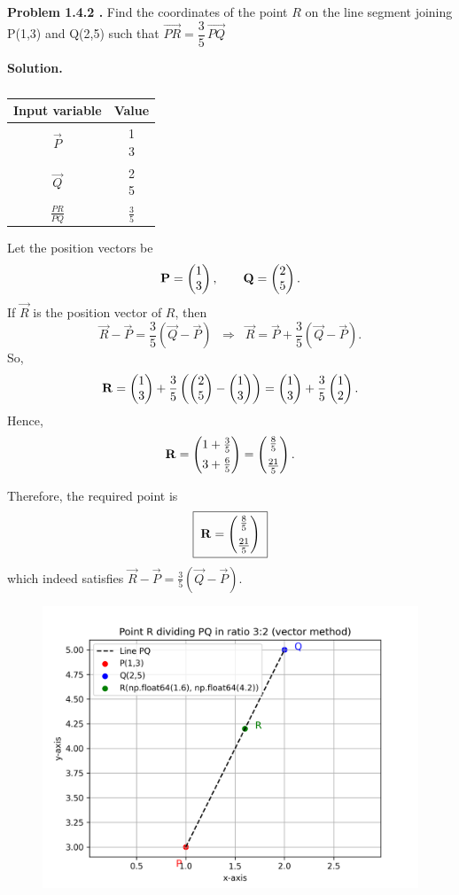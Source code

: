 \documentclass[12pt]{article}
\begin{document}
\textbf{Problem 1.4.2 .}  
Find the coordinates of the point \(R\) on the line segment joining
P(1,3) and Q(2,5) such that $\vec{PR}=\dfrac{3}{5}\,\vec{PQ}$


\textbf{Solution.}  

\begin{table}[H]
\centering
\begin{tabular}[12pt]{ |c| c|}
    \hline
    \textbf{Input variable} & \textbf{Value}\\ 
    \hline
    $\vec{P}$ & \myvec{1 \\3 } \\
    \hline 
    $\vec{Q}$ & \myvec{2 \\ 5}\\
    \hline
    $\frac{PR}{PQ}$ & $\frac{3}{5}$\\
    \hline
    \end{tabular}
    \caption{
    \label{}
    }
 \end{table}
Let the position vectors be
$$
\mathbf{P} = \begin{pmatrix}1 \\ 3\end{pmatrix}, \qquad
\mathbf{Q} = \begin{pmatrix}2 \\ 5\end{pmatrix}.
$$
If \(\vec{R}\) is the position vector of \(R\), then
$$
\vec{R} - \vec{P} = \frac{3}{5}(\vec{Q} - \vec{P})
\;\;\Longrightarrow\;\;
\vec{R} = \vec{P} + \frac{3}{5}(\vec{Q} - \vec{P}).
$$
So,
$$
\mathbf{R}
= \begin{pmatrix}1 \\ 3\end{pmatrix}
+ \frac{3}{5}\left(\begin{pmatrix}2 \\ 5\end{pmatrix} - \begin{pmatrix}1 \\ 3\end{pmatrix}\right)
= \begin{pmatrix}1 \\ 3\end{pmatrix} + \frac{3}{5}\begin{pmatrix}1 \\ 2\end{pmatrix}.
$$
Hence,
$$
\mathbf{R} = \begin{pmatrix}1+\tfrac{3}{5} \\[4pt] 3+\frac{6}{5}\end{pmatrix}
= \begin{pmatrix}\frac{8}{5} \\[6pt] \frac{21}{5}\end{pmatrix}.
$$

Therefore, the required point is
$$
\boxed{\;\mathbf{R} = \begin{pmatrix}\frac{8}{5} \\[6pt] \frac{21}{5}\end{pmatrix}\;}
$$
which indeed satisfies \(\vec{R} - \vec{P} = \frac{3}{5}(\vec{Q} - \vec{P})\).

\begin{figure}[H]
    \centering
    \includegraphics[width=1\columnwidth]{figs/PQ_R_plot.png}
    \caption{}
    \label{fig:placeholder}
\end{figure}
\end{document}
